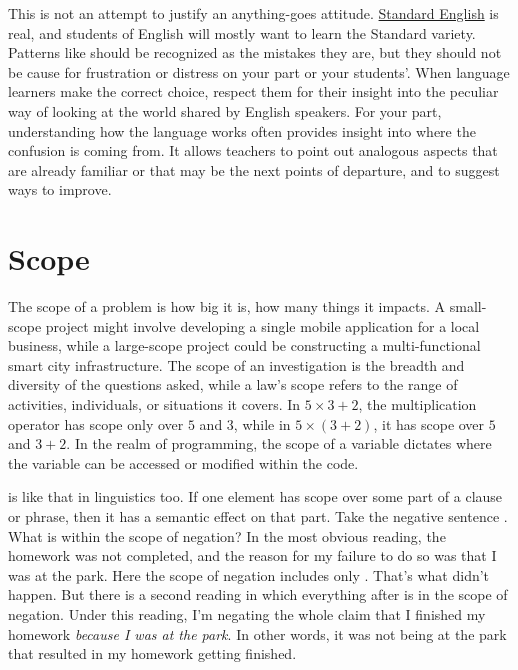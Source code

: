 This is not an attempt to justify an anything-goes attitude. \hyperref[ch:standards]{Standard English} is real, and students of English will mostly want to learn the Standard variety. Patterns like  should be recognized as the mistakes they are, but they should not be cause for frustration or distress on your part or your students'. When language learners make the correct choice, respect them for their insight into the peculiar way of looking at the world shared by English speakers. For your part, understanding how the language works often provides insight into where the confusion is coming from. It allows teachers to point out analogous aspects that are already familiar or that may be the next points of departure, and to suggest ways to improve.


\section{Scope}
The scope of a problem is how big it is, how many things it impacts. A small-scope project might involve developing a single mobile application for a local business, while a large-scope project could be constructing a multi-functional smart city infrastructure. The scope of an investigation is the breadth and diversity of the questions asked, while a law's scope refers to the range of activities, individuals, or situations it covers. In $5\times3+2$, the multiplication operator has scope only over $5$ and $3$, while in $5 \times (3 + 2)$, it has scope over $5$ and $3+2$. In the realm of programming, the scope of a variable dictates where the variable can be accessed or modified within the code.

 is like that in linguistics too. If one element has scope over some part of a clause or phrase, then it has a semantic effect on that part. Take the negative sentence . What is within the scope of negation? In the most obvious reading, the homework was not completed, and the reason for my failure to do so was that I was at the park. Here the scope of negation includes only . That's what didn't happen. But there is a second reading in which everything after  is in the scope of negation. Under this reading, I'm negating the whole claim that I finished my homework \emph{because I was at the park}. In other words, it was not being at the park that resulted in my homework getting finished.

